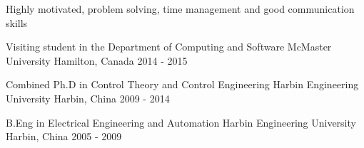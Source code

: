  \begin{cventries}
 	\cventry
 	{}
 	{ Highly motivated, problem solving, time management and good communication skills}
 	{}
 	{}
 	{
 	}
 	
 	\cventry
 	{Visiting student in the Department of Computing and Software}
 	{McMaster University}
 	{Hamilton, Canada}
 	{2014 - 2015}
 	{
 	}
 	
 	\cventry
 	{Combined Ph.D in Control Theory and Control Engineering}
 	{Harbin Engineering University}
 	{Harbin, China}
 	{2009 - 2014}
 	{
 	}
 	
 	\cventry
 	{B.Eng in Electrical Engineering and Automation}
 	{Harbin Engineering University}
 	{Harbin, China}
 	{2005 - 2009}
 	{
 	}
 	
 	
 	
 \end{cventries}

